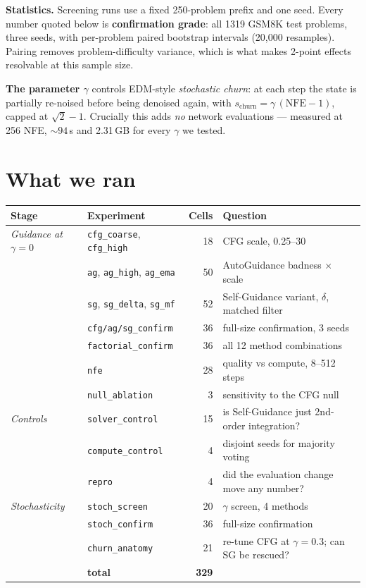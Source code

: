 \documentclass[11pt,a4paper]{article}
\begin{document}
\textbf{Statistics.} Screening runs use a fixed 250-problem prefix and one seed. Every number quoted below is \textbf{confirmation grade}: all 1319 GSM8K test problems, three seeds, with per-problem paired bootstrap intervals (20{,}000 resamples). Pairing removes problem-difficulty variance, which is what makes 2-point effects resolvable at this sample size.

\textbf{The parameter $\gamma$} controls EDM-style \emph{stochastic churn}: at each step the state is partially re-noised before being denoised again, with $s_{\text{churn}}=\gamma\,(\text{NFE}-1)$, capped at $\sqrt2-1$. Crucially this adds \emph{no} network evaluations --- measured at 256 NFE, ${\sim}94$\,s and 2.31\,GB for every $\gamma$ we tested.

\section{What we ran}
\begin{center}\footnotesize
\begin{tabular}{llrl}
\toprule
\textbf{Stage} & \textbf{Experiment} & \textbf{Cells} & \textbf{Question} \\
\midrule
\textit{Guidance at} $\gamma=0$
 & \texttt{cfg\_coarse}, \texttt{cfg\_high} & 18 & CFG scale, 0.25--30 \\
 & \texttt{ag}, \texttt{ag\_high}, \texttt{ag\_ema} & 50 & AutoGuidance badness $\times$ scale \\
 & \texttt{sg}, \texttt{sg\_delta}, \texttt{sg\_mf} & 52 & Self-Guidance variant, $\delta$, matched filter \\
 & \texttt{cfg/ag/sg\_confirm} & 36 & full-size confirmation, 3 seeds \\
 & \texttt{factorial\_confirm} & 36 & all 12 method combinations \\
 & \texttt{nfe} & 28 & quality vs compute, 8--512 steps \\
 & \texttt{null\_ablation} & 3 & sensitivity to the CFG null \\
\midrule
\textit{Controls}
 & \texttt{solver\_control} & 15 & is Self-Guidance just 2nd-order integration? \\
 & \texttt{compute\_control} & 4 & disjoint seeds for majority voting \\
 & \texttt{repro} & 4 & did the evaluation change move any number? \\
\midrule
\textit{Stochasticity}
 & \texttt{stoch\_screen} & 20 & $\gamma$ screen, 4 methods \\
 & \texttt{stoch\_confirm} & 36 & full-size confirmation \\
 & \texttt{churn\_anatomy} & 21 & re-tune CFG at $\gamma{=}0.3$; can SG be rescued? \\
\midrule
 & \textbf{total} & \textbf{329} & \\
\bottomrule
\end{tabular}
\end{center}
\end{document}
